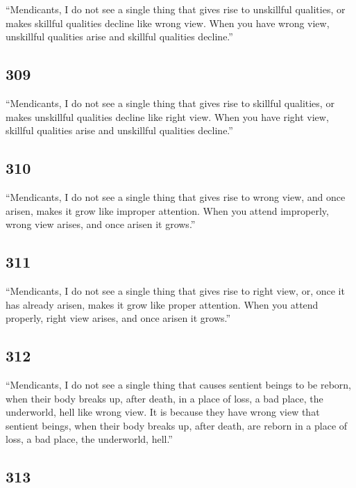 \documentclass[12pt,openany]{book}%
\begin{document}
“Mendicants, I do not see a single thing that gives rise to unskillful qualities, or makes skillful qualities decline like wrong view. When you have wrong view, unskillful qualities arise and skillful qualities decline.” 

\subsection*{309 }

“Mendicants, I do not see a single thing that gives rise to skillful qualities, or makes unskillful qualities decline like right view. When you have right view, skillful qualities arise and unskillful qualities decline.” 

\subsection*{310 }

“Mendicants, I do not see a single thing that gives rise to wrong view, and once arisen, makes it grow like improper attention. When you attend improperly, wrong view arises, and once arisen it grows.” 

\subsection*{311 }

“Mendicants, I do not see a single thing that gives rise to right view, or, once it has already arisen, makes it grow like proper attention. When you attend properly, right view arises, and once arisen it grows.” 

\subsection*{312 }

“Mendicants, I do not see a single thing that causes sentient beings to be reborn, when their body breaks up, after death, in a place of loss, a bad place, the underworld, hell like wrong view. It is because they have wrong view that sentient beings, when their body breaks up, after death, are reborn in a place of loss, a bad place, the underworld, hell.” 

\subsection*{313 }
\end{document}
